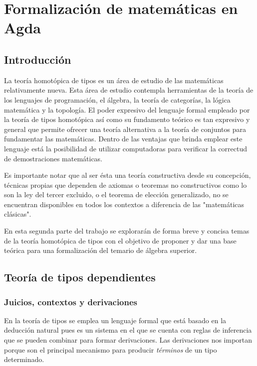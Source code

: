 \documentclass{article}
\begin{document}
\section{Formalización de matemáticas en Agda}

\subsection{Introducción}
La teoría homotópica de tipos es un área de estudio de las matemáticas relativamente nueva. 
Esta área de estudio contempla herramientas de la teoría de los lenguajes de programación, el álgebra, la teoría de categorías, la lógica matemática y la topología.
El poder expresivo del lenguaje formal empleado por la teoría de tipos homotópica así como su fundamento teórico es tan expresivo y general que permite
ofrecer una teoría alternativa a la teoría de conjuntos para fundamentar las matemáticas. Dentro de las ventajas que brinda emplear este lenguaje
está la posibilidad de utilizar computadoras para verificar la correctud de demostraciones matemáticas.

Es importante notar que al ser ésta una teoría constructiva desde su concepción, técnicas propias que dependen de axiomas o teoremas no constructivos como lo son
la ley del tercer excluido, o el teorema de elección generalizado, no se encuentran disponibles en todos los contextos a diferencia de las "matemáticas clásicas".

En esta segunda parte del trabajo se explorarán de forma breve y concisa temas de la teoría homotópica de tipos con el objetivo
de proponer y dar una base teórica para una formalización del temario de álgebra superior.

\subsection{Teoría de tipos dependientes}
    \subsubsection{Juicios, contextos y derivaciones}
        En la teoría de tipos se emplea un lenguaje formal que está basado en la deducción natural pues es un sistema en el que se cuenta
        con reglas de inferencia que se pueden combinar para formar derivaciones. Las derivaciones nos importan porque son el principal
        mecanismo para producir \textit{términos} de un tipo determinado.
        
\end{document}
